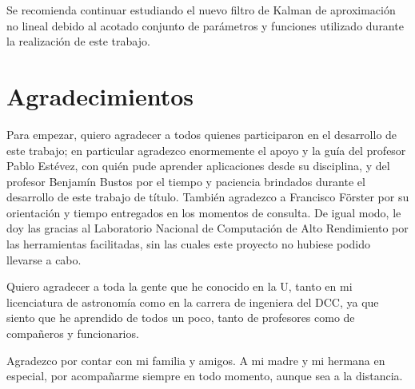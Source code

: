 \begin{preface}
Se recomienda continuar estudiando el nuevo filtro de Kalman de aproximaci\'on no lineal debido al acotado conjunto de par\'ametros y funciones utilizado durante la realizaci\'on de este trabajo.



\section{Agradecimientos}

Para empezar, quiero agradecer a todos quienes participaron en el desarrollo de este trabajo; en particular agradezco enormemente el apoyo y la gu\'ia del profesor Pablo Est\'evez, con qui\'en pude aprender aplicaciones desde su disciplina, y del profesor Benjam\'in Bustos por el tiempo y paciencia brindados durante el desarrollo de este trabajo de t\'itulo. Tambi\'en agradezco a Francisco F\"orster por su orientaci\'on y tiempo entregados en los momentos de consulta. De igual modo, le doy las gracias al Laboratorio Nacional de Computaci\'on de Alto Rendimiento por las herramientas facilitadas, sin las cuales este proyecto no hubiese podido llevarse a cabo.
\bigskip

Quiero agradecer a toda la gente que he conocido en la U, tanto en mi licenciatura de astronom\'ia como en la carrera de ingeniera del DCC, ya que siento que he aprendido de todos un poco, tanto de profesores como de compa\~neros y funcionarios.   
\bigskip

Agradezco por contar con mi familia y amigos. A mi madre y mi hermana en especial, por acompa\~narme siempre en todo momento, aunque sea a la distancia. 


\begin{flushright}
\makeatletter
	\@author
\makeatother
\end{flushright}

\end{preface}